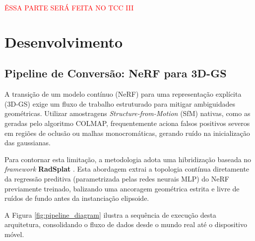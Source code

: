 \textcolor{red}{ÊSSA PARTE SERÁ FEITA NO TCC III}

\chapter[Desenvolvimento]{Desenvolvimento}

\section{Pipeline de Conversão: NeRF para 3D-GS}

A transição de um modelo contínuo (NeRF) para uma representação explícita (3D-GS) exige um fluxo de trabalho estruturado para mitigar ambiguidades geométricas. Utilizar amostragens \textit{Structure-from-Motion} (SfM) nativas, como as geradas pelo algoritmo COLMAP, frequentemente aciona falsos positivos severos em regiões de oclusão ou malhas monocromáticas, gerando ruído na inicialização das gaussianas.

Para contornar esta limitação, a metodologia adota uma hibridização baseada no \textit{framework} \textbf{RadSplat} \cite{niemeyer2024}. Esta abordagem extrai a topologia contínua diretamente da regressão preditiva (parametrizada pelas redes neurais MLP) do NeRF previamente treinado, balizando uma ancoragem geométrica estrita e livre de ruídos de fundo antes da instanciação elipsoide. 

A Figura \ref{fig:pipeline_diagram} ilustra a sequência de execução desta arquitetura, consolidando o fluxo de dados desde o mundo real até o dispositivo móvel.

